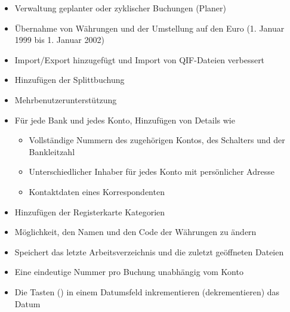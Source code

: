 \begin{itemize}
	\item Verwaltung geplanter oder zyklischer Buchungen (Planer)%
	\item Übernahme von Währungen und der Umstellung auf den Euro (1. Januar 1999 bis 1. Januar 2002)%
	\item Import/Export hinzugefügt und Import von \gls{QIF}-Dateien verbessert%
	\item Hinzufügen der Splittbuchung%
	\item Mehrbenutzerunterstützung%
	\item Für jede Bank und jedes Konto, Hinzufügen von Details wie%
		\begin{itemize}
		\item[\textopenbullet] Vollständige Nummern des zugehörigen Kontos, des Schalters und der Bankleitzahl%
		\item[\textopenbullet] Unterschiedlicher Inhaber für jedes Konto mit persönlicher Adresse%
		\item[\textopenbullet] Kontaktdaten eines Korrespondenten%
		\end{itemize}
	\item Hinzufügen der Registerkarte Kategorien%
	\item Möglichkeit, den Namen und den Code der Währungen zu ändern%
	\item Speichert das letzte Arbeitsverzeichnis und die zuletzt geöffneten Dateien%
	\item Eine eindeutige Nummer pro Buchung unabhängig vom Konto%
	\item Die Tasten \key{+} (\key{-}) in einem Datumsfeld inkrementieren (dekrementieren) das Datum%

\end{itemize}
